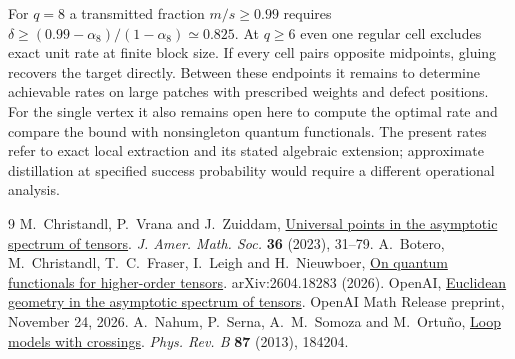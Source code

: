 \documentclass[11pt]{article}
\begin{document}
For \(q=8\) a transmitted fraction \(m/s\ge0.99\) requires
\(\delta\ge(0.99-\alpha_8)/(1-\alpha_8)\simeq0.825\).
At \(q\ge6\) even one regular cell excludes exact unit rate at finite
block size. If every cell pairs opposite midpoints, gluing recovers the
target directly. Between these endpoints it remains to determine
achievable rates on large patches with prescribed weights and defect
positions. For the single vertex it also remains open here to compute
the optimal rate and compare the bound with nonsingleton quantum
functionals. The present rates refer to exact local extraction and its
stated algebraic extension; approximate distillation at specified
success probability would require a different operational analysis.

\begin{thebibliography}{9}
M.~Christandl, P.~Vrana and J.~Zuiddam,
\href{https://doi.org/10.1090/jams/996}{Universal points in the asymptotic spectrum of tensors}.
\emph{J. Amer. Math. Soc.} \textbf{36} (2023), 31--79.
A.~Botero, M.~Christandl, T.~C.~Fraser, I.~Leigh and H.~Nieuwboer,
\href{https://arxiv.org/abs/2604.18283}{On quantum functionals for higher-order tensors}.
arXiv:2604.18283 (2026).
OpenAI,
\href{https://github.com/openai/math/blob/main/preprints/Euclidean-geometry-in-the-asymptotic-spectrum-of-tensors-November-24-2026/paper.pdf}{Euclidean geometry in the asymptotic spectrum of tensors}.
OpenAI Math Release preprint, November 24, 2026.
A.~Nahum, P.~Serna, A.~M.~Somoza and M.~Ortu\~no,
\href{https://doi.org/10.1103/PhysRevB.87.184204}{Loop models with crossings}.
\emph{Phys. Rev. B} \textbf{87} (2013), 184204.
\end{thebibliography}
\end{document}
